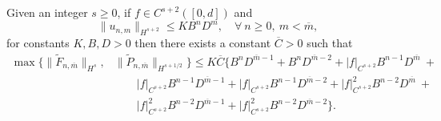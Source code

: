\begin{lemma} Given an integer $s\ge 0$, if $f\in C^{s+2}([0,d])$ and
\begin{equation}\|u_{n,m}\|_{H^{s+2}} \le KB^nD^m, \quad \forall ~n\ge 0,~ m < \overline{m}, \end{equation}
for constants $K,B,D>0$ then there exists a constant $\overline{C}>0$ such that
\begin{align*}
\max\{\|\tilde{F}_{n, \overline{m}}\|_{H^s},& \|\tilde{P}_{n, \overline{m}}\|_{H^{s+1/2}}\}
   \le K \overline{C}\bigg\{B^nD^{\overline{m}-1}+B^nD^{\overline{m}-2} + |f|_{C^{s+2}}B^{n-1}D^{\overline{m}} ~+\\&\qquad
|f|_{C^{s+2}}B^{n-1}D^{\overline{m}-1} +  |f|_{C^{s+2}}B^{n-1}D^{\overline{m}-2} +
  |f|_{C^{s+2}}^2B^{n-2}D^{\overline{m}} ~+ \\&\qquad
|f|_{C^{s+2}}^2B^{n-2}D^{\overline{m}-1} +
|f|_{C^{s+2}}^2B^{n-2}D^{\overline{m}-2} \bigg\}.
\end{align*}
\end{lemma}
\vskip 0.1in
